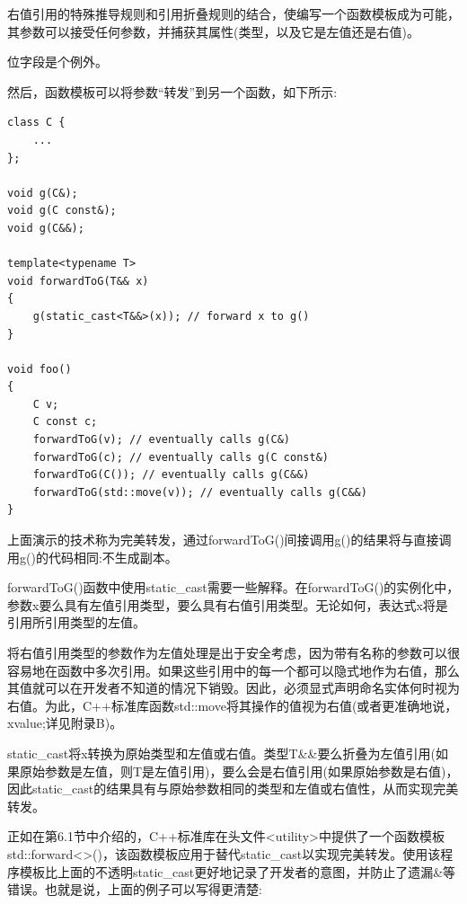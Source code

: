 右值引用的特殊推导规则和引用折叠规则的结合，使编写一个函数模板成为可能，其参数可以接受任何参数，并捕获其属性(类型，以及它是左值还是右值)。

\begin{tcolorbox}[colback=webgreen!5!white,colframe=webgreen!75!black]
\hspace*{0.75cm}位字段是个例外。
\end{tcolorbox}

然后，函数模板可以将参数“转发”到另一个函数，如下所示:

\begin{lstlisting}[style=styleCXX]
class C {
	...
};

void g(C&);
void g(C const&);
void g(C&&);

template<typename T>
void forwardToG(T&& x)
{
	g(static_cast<T&&>(x)); // forward x to g()
}

void foo()
{
	C v;
	C const c;
	forwardToG(v); // eventually calls g(C&)
	forwardToG(c); // eventually calls g(C const&)
	forwardToG(C()); // eventually calls g(C&&)
	forwardToG(std::move(v)); // eventually calls g(C&&)
}
\end{lstlisting}

上面演示的技术称为完美转发，通过forwardToG()间接调用g()的结果将与直接调用g()的代码相同:不生成副本。

forwardToG()函数中使用static\_cast需要一些解释。在forwardToG()的实例化中，参数x要么具有左值引用类型，要么具有右值引用类型。无论如何，表达式x将是引用所引用类型的左值。

\begin{tcolorbox}[colback=webgreen!5!white,colframe=webgreen!75!black]
\hspace*{0.75cm}将右值引用类型的参数作为左值处理是出于安全考虑，因为带有名称的参数可以很容易地在函数中多次引用。如果这些引用中的每一个都可以隐式地作为右值，那么其值就可以在开发者不知道的情况下销毁。因此，必须显式声明命名实体何时视为右值。为此，C++标准库函数std::move将其操作的值视为右值(或者更准确地说，xvalue;详见附录B)。
\end{tcolorbox}

static\_cast将x转换为原始类型和左值或右值。类型T\&\&要么折叠为左值引用(如果原始参数是左值，则T是左值引用)，要么会是右值引用(如果原始参数是右值)，因此static\_cast的结果具有与原始参数相同的类型和左值或右值性，从而实现完美转发。

正如在第6.1节中介绍的，C++标准库在头文件<utility>中提供了一个函数模板std::forward<>()，该函数模板应用于替代static\_cast以实现完美转发。使用该程序模板比上面的不透明static\_cast更好地记录了开发者的意图，并防止了遗漏\&等错误。也就是说，上面的例子可以写得更清楚:

